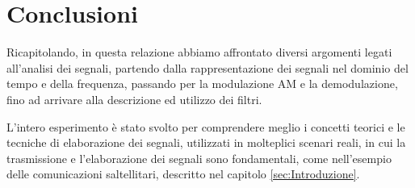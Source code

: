 \section{Conclusioni}
\label{sec:Conclusioni}
\thispagestyle{plain}

Ricapitolando, in questa relazione abbiamo affrontato diversi argomenti legati all'analisi dei segnali, partendo dalla rappresentazione dei segnali nel dominio del tempo e della frequenza, passando per la modulazione AM e la demodulazione, fino ad arrivare alla descrizione ed utilizzo dei filtri. 

L'intero esperimento è stato svolto per comprendere meglio i concetti teorici e le tecniche di elaborazione dei segnali, utilizzati in molteplici scenari reali, in cui la trasmissione e l'elaborazione dei segnali sono fondamentali, come nell'esempio delle comunicazioni saltellitari, descritto nel capitolo \ref{sec:Introduzione}.



\pagebreak